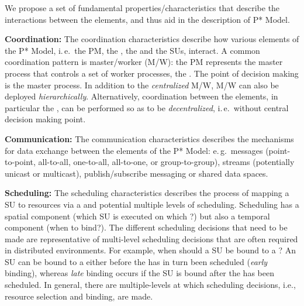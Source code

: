 \documentclass{sig-alternate}
\begin{document}

 
We propose a set of fundamental properties/characteristics that
describe the interactions between the elements, and thus aid in the
description of P* Model.


\textbf{Coordination:} The coordination characteristics describe how
various elements of the P* Model, i.\,e.\ the PM, the \pilot, the \cus
and the SUs, interact. A common coordination pattern is master/worker
(M/W): the PM represents the master process that controls a set of
worker processes, the \pilots. The point of decision making is the
master process. In addition to the \emph{centralized} M/W, M/W can
also be deployed \emph{hierarchically}.  Alternatively, coordination
between the elements, in particular the \pilots, can be performed so as
to be \emph{decentralized}, i.\,e.\ without central decision making
point.

%

\textbf{Communication:} The communication characteristics describes the
mechanisms for data exchange between the elements of the P* Model:
e.\,g.\ messages (point-to-point, all-to-all, one-to-all, all-to-one,
or group-to-group), streams (potentially unicast or multicast),
publish/subscribe messaging or shared data spaces.
		
\textbf{Scheduling:} The scheduling characteristics describes the
process of mapping a SU to resources via a \pilot and potential
multiple levels of scheduling. Scheduling has a spatial component
(which SU is executed on which \pilot?) but also a temporal component
(when to bind?). The different scheduling decisions that need to be
made are representative of multi-level scheduling decisions that are
often required in distributed environments.  For example, when should
a SU be bound to a \pilot?  An SU can be bound to a \pilot either before
the \pilot has in turn been scheduled ({\it early} binding), whereas
{\it late} binding occurs if the SU is bound after the \pilot has been
scheduled.  In general, there are multiple-levels at which scheduling
decisions, i.e., resource selection and binding, are made.
\end{document}
